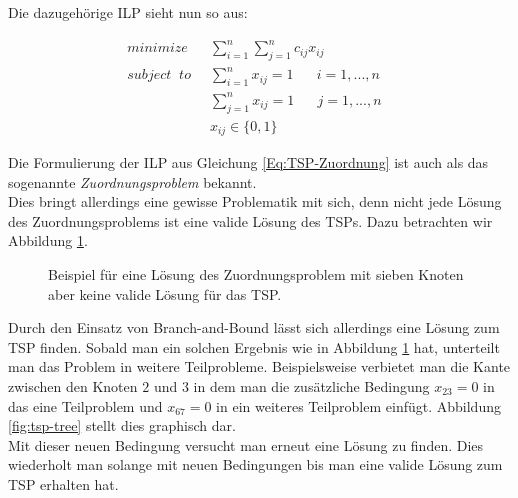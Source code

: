 \documentclass[tog]{acmsiggraph}
\begin{document}
Die dazugehörige ILP sieht nun so aus:

\large
\begin{align}
\label{Eq:TSP-Zuordnung}
minimize \;\; &\sum^{n}_{i=1}\sum^{n}_{j=1} c_{ij}x_{ij}& \nonumber \\
subject \;\; to \;\; &\sum^{n}_{i=1}x_{ij} = 1 \;\;\;\;\;\;i = 1,...,n \nonumber \\
&\sum^{n}_{j=1}x_{ij} = 1 \;\;\;\;\;\;j = 1,...,n \nonumber \\
& x_{ij} \in \{0, 1\}
\end{align}
\normalsize

Die Formulierung der ILP aus Gleichung \ref{Eq:TSP-Zuordnung} ist auch als das sogenannte \textit{Zuordnungsproblem} bekannt.\\
Dies bringt allerdings eine gewisse Problematik mit sich, denn nicht jede Lösung des Zuordnungsproblems ist eine valide Lösung des TSPs. Dazu betrachten wir Abbildung \ref{fig:tsp-result}.

\begin{figure}[ht]
\centering
{}
\caption{Beispiel für eine Lösung des Zuordnungsproblem mit sieben Knoten aber keine valide Lösung für das TSP.}
\label{fig:tsp-result}
\end{figure}

Durch den Einsatz von Branch-and-Bound lässt sich allerdings eine Lösung zum TSP finden. Sobald man ein solchen Ergebnis wie in Abbildung \ref{fig:tsp-result} hat, unterteilt man das Problem in weitere Teilprobleme. Beispielsweise verbietet man die Kante zwischen den Knoten $2$ und $3$ in dem man die zusätzliche Bedingung $x_{23} = 0$ in das eine Teilproblem und $x_{67} = 0$ in ein weiteres Teilproblem einfügt. Abbildung \ref{fig:tsp-tree} stellt dies graphisch dar.\\
Mit dieser neuen Bedingung versucht man erneut eine Lösung zu finden. Dies wiederholt man solange mit neuen Bedingungen bis man eine valide Lösung zum TSP erhalten hat.
\end{document}
